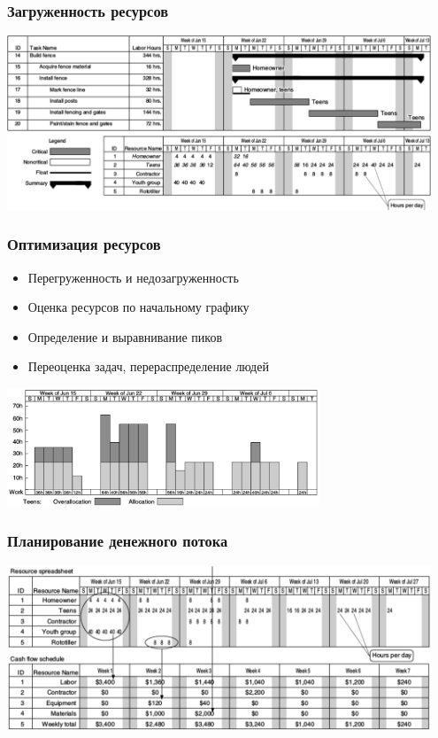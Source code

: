 \documentclass{../../slides-style}
\begin{document}
    \begin{frame}
        \frametitle{Загруженность ресурсов}
        \begin{center}
            \includegraphics[width=0.95\textwidth]{ganttChartResourceUtilization.png}
        \end{center}
    \end{frame}

    \begin{frame}
        \frametitle{Оптимизация ресурсов}
        \begin{itemize}
            \item Перегруженность и недозагруженность
            \item Оценка ресурсов по начальному графику
            \item Определение и выравнивание пиков
            \item Переоценка задач, перераспределение людей
        \end{itemize}
        \begin{center}
            \includegraphics[width=0.7\textwidth]{resourceAllocation.png}
        \end{center}
    \end{frame}

    \begin{frame}
        \frametitle{Планирование денежного потока}
        \begin{center}
            \includegraphics[width=0.95\textwidth]{cashFlow.png}
        \end{center}
    \end{frame}
\end{document}
